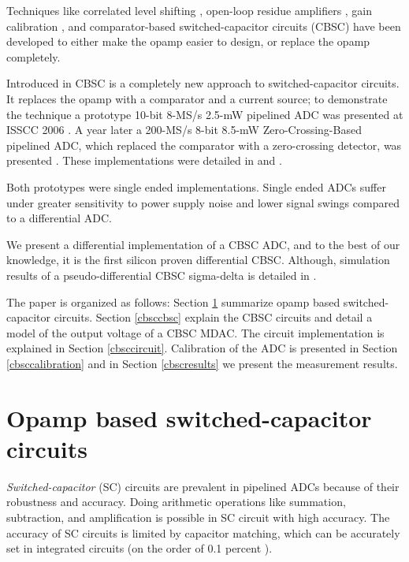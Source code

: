  Techniques like correlated level shifting
\cite{gregoire08}, open-loop residue amplifiers \cite{murmann03}, gain calibration \cite{hernes07,mcneill05}, and
comparator-based switched-capacitor circuits (CBSC)  \cite{sepke06} have been
developed to either make the opamp easier to design, or replace the
opamp completely. 

Introduced in
\cite{sepke06} CBSC is a completely new approach to switched-capacitor
circuits. It replaces the opamp with a comparator and a current
source; to demonstrate the technique a prototype 10-bit 8-MS/s 
2.5-mW pipelined ADC was presented at ISSCC 2006 \cite{sepke06}. A
year later a 200-MS/s 8-bit 8.5-mW Zero-Crossing-Based pipelined ADC,
which replaced the comparator with a zero-crossing detector,
was presented \cite{brooks07}. These implementations were
 detailed in
\cite{fiorenza06} and \cite{brooks07a}.

 Both prototypes were single ended
implementations. Single ended ADCs suffer under greater sensitivity to
power supply noise and lower signal swings compared to a differential
ADC. 

We present a differential implementation of a
CBSC ADC, and to the best of our knowledge, it is the first silicon
proven differential CBSC. Although, simulation
results of a pseudo-differential 
CBSC sigma-delta is detailed in
\cite{prelog07}.

The paper is organized as follows:
Section \ref{cbscopamp} summarize opamp based switched-capacitor
circuits. Section \ref{cbsccbsc} explain the CBSC circuits and detail a
model of the output voltage of a CBSC MDAC. The circuit implementation
is explained in Section \ref{cbsccircuit}. Calibration of the ADC is
presented in Section \ref{cbsccalibration} and in Section
\ref{cbscresults} we present
the measurement results.



\section{Opamp based switched-capacitor circuits} \label{cbscopamp}
\textit{Switched-capacitor} (SC) circuits are prevalent in pipelined ADCs
because of their robustness and accuracy. Doing
arithmetic operations like summation, subtraction, and amplification
is possible in SC circuit with high accuracy. 
The 
accuracy of SC circuits is limited by capacitor matching, which can be
accurately set in integrated circuits (on the order of 0.1 percent
\cite[page 185]{johns}).  

